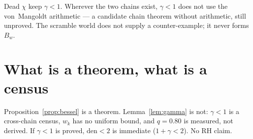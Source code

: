 \documentclass[11pt]{article}
\theoremstyle{remark}
\begin{document}
Dead $\chi$ keep $\gamma<1$.
Wherever the two chains exist,
$\gamma<1$ does not use the von~Mangoldt
arithmetic --- a candidate chain theorem
without arithmetic, still unproved.
The scramble world does not supply a
counter-example; it never forms $B_w$.

\section{What is a theorem, what is a census}\label{sec:honest}

Proposition~\ref{prop:bessel} is a theorem.
Lemma~\ref{lem:gamma} is not:
$\gamma<1$ is a cross-chain census,
$w_k$ has no uniform bound,
and $q=0.80$ is measured, not derived.
If $\gamma<1$ is proved,
$\mathrm{den}<2$ is immediate
($1+\gamma<2$).
No RH claim.
\end{document}

